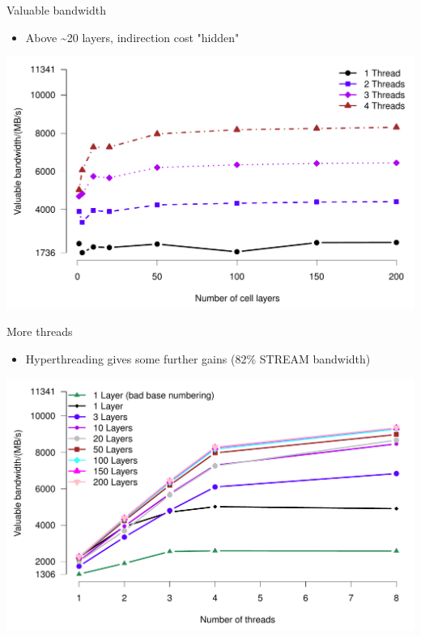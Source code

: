\documentclass[bigger]{beamer}
\begin{document}
\begin{frame}[label={sec:orgheadline21}]{Valuable bandwidth}
\begin{itemize}
\item Above \textasciitilde{}20 layers, indirection cost "hidden"
\end{itemize}
\begin{center}
\includegraphics[height=0.8\textheight]{02-22-SIAM-PP-extruded-meshes.figures/valuable-bandwidth-by-layer}
\end{center}
\end{frame}
\begin{frame}[label={sec:orgheadline22}]{More threads}
\begin{itemize}
\item Hyperthreading gives some further gains (82\% STREAM bandwidth)
\end{itemize}
\begin{center}
\includegraphics[height=0.8\textheight]{02-22-SIAM-PP-extruded-meshes.figures/valuable-bandwidth-by-thread}
\end{center}
\end{frame}
\end{document}
